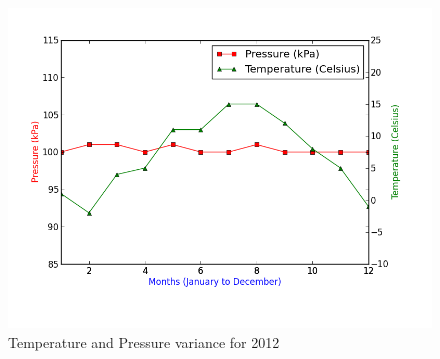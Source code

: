 \begin{figure}[H]
\centering
\includegraphics[width=0.99\linewidth,natwidth=898,natheight=587]{billeder/pressureTemperatureVariance.png}
\caption{Temperature and Pressure variance for 2012}
\label{fig:pressureTemperatureVariance}
\end{figure}

